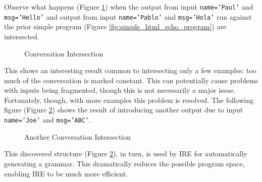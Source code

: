 Observe what happens (Figure \ref{fig:conversation_intersection}) when the output from input \texttt{name='Paul'} and \texttt{msg='Hello'} and output from input \texttt{name='Pablo'} and \texttt{msg='Hola'} run against the prior simple program (Figure \ref{fig:simple_html_echo_program}) are intersected.

\begin{figure}[H]
\caption{Conversation Intersection}
\label{fig:conversation_intersection}
\end{figure}

This shows an interesting result common to intersecting only a few examples: too much of the conversation is marked constant.
This can potentially cause problems with inputs being fragmented, though this is not necessarily a major issue.
Fortunately, though, with more examples this problem is resolved.
The following figure (Figure \ref{fig:another_conversation_intersection}) shows the result of introducing another output due to input \texttt{name='Joe'} and \texttt{msg='ABC'}.

\begin{figure}[H]
\caption{Another Conversation Intersection}
\label{fig:another_conversation_intersection}
\end{figure}

This discovered structure (Figure \ref{fig:another_conversation_intersection}), in turn, is used by IRE for automatically generating a grammar.
This dramatically reduces the possible program space, enabling IRE to be much more efficient.
